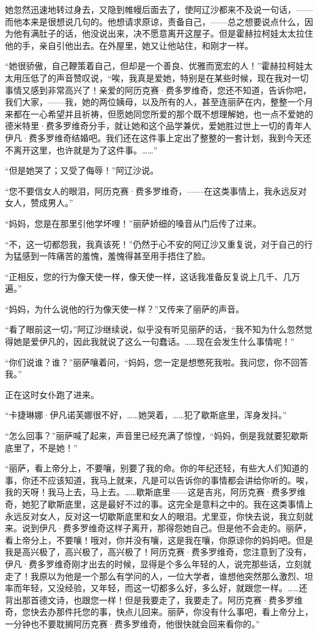 \par 她忽然迅速地转过身去，又隐到帷幔后面去了，使阿辽沙都来不及说一句话，——而他本来是很想说几句的。他想请求原谅，责备自己，——总之想要说点什么，因为他有满肚子的话，他没说出来，决不愿意离开这屋子。但是霍赫拉柯娃太太拉住他的手，亲自引他出去。在外屋里，她又让他站住，和刚才一样。
\par “她很骄傲，自己鞭策着自己，但却是一个善良、优雅而宽宏的人！”霍赫拉柯娃太太用压低了的声音赞叹说，“唉，我真是爱她，特别是在某些时候，现在我对一切事情又感到非常高兴了！亲爱的阿历克赛·费多罗维奇，您还不知道，告诉你吧，我们大家，——我，她的两位姨母，以及所有的人，甚至连丽萨在内，整整一个月来都在一心希望并且祈祷，但愿她同您所爱的那个既不想理解她，也一点不爱她的德米特里·费多罗维奇分手，就让她和这个品学兼优，爱她胜过世上一切的青年人伊凡·费多罗维奇结婚吧。我们还在这件事上定出了整整的一套计划，我到今天还不离开这里，也许就是为了这件事。……”
\par “但是她哭了；又受了侮辱！”阿辽沙说。
\par “您不要信女人的眼泪，阿历克赛·费多罗维奇，——在这类事情上，我永远反对女人，赞成男人。”
\par “妈妈，您是在那里引他学坏哩！”丽萨娇细的嗓音从门后传了过来。
\par “不，这一切都怨我，我真该死！”仍然于心不安的阿辽沙又重复说，对于自己的行为猛感到一阵痛苦的羞愧，羞愧得甚至用手捂住了脸。
\par “正相反，您的行为像天使一样，像天使一样，这话我准备反复说上几千、几万遍。”
\par “妈妈，为什么说他的行为像天使一样？”又传来了丽萨的声音。
\par “看了眼前这一切，”阿辽沙继续说，似乎没有听见丽萨的话，“我不知为什么忽然觉得她是爱伊凡的，因此我就说了这么一句蠢话。……现在会发生什么事情呢！”
\par “你们说谁？谁？”丽萨嚷着问，“妈妈，您一定是想憋死我啦。我问您，你不回答我。”
\par 正在这时女仆跑了进来。
\par “卡捷琳娜·伊凡诺芙娜很不好，……她哭着，……犯了歇斯底里，浑身发抖。”
\par “怎么回事？”丽萨喊了起来，声音里已经充满了惊惶，“妈妈，倒是我就要犯歇斯底里了，不是她！”
\par “丽萨，看上帝分上，不要嚷，别要了我的命。你的年纪还轻，有些大人们知道的事，你还不应该知道，我马上就来，凡是可以告诉你的事情都会讲给你听的。唉，我的天呀！我马上去，马上去。……歇斯底里——这是吉兆，阿历克赛·费多罗维奇，她犯了歇斯底里，这是最好不过的事。这完全是意料之中的。我在这类事情上永远反对女人，反对这一切歇斯底里和女人的眼泪。尤里亚，你快去说，我立刻就来。说到伊凡·费多罗维奇这样子离开，那得怨她自己。但是他不会走的。丽萨，看上帝分上，不要嚷！哦对，你并没有嚷，这是我在嚷，你原谅你的妈妈吧。但是我是高兴极了，高兴极了，高兴极了！阿历克赛·费多罗维奇，您注意到了没有，伊凡·费多罗维奇刚才出去的时候，显得是个多么年轻的人，说完那些话，立刻就走了！我原以为他是一个那么有学问的人，一位大学者，谁想他突然那么激烈、坦率而年轻，又没经验，又年轻，而这一切都多么好，多么好，就跟您一样。……还背出那首德文诗，也跟您一样！但是我要走了，我要走了。阿历克赛·费多罗维奇，您快去办那件托您的事，快点儿回来。丽萨，你没有什么事吧，看上帝分上，一分钟也不要耽搁阿历克赛·费多罗维奇，他很快就会回来看你的。”
